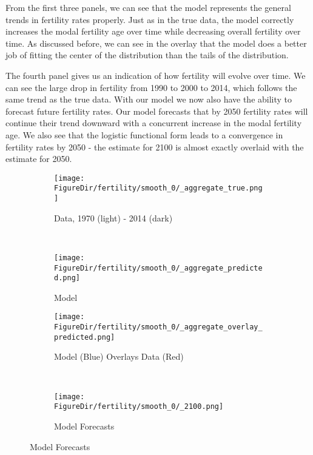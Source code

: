 \documentclass[10pt]{article}
\renewcommand{\thesection}{\arabic{section}}
\renewcommand{\thesubsection}{\thesection.\arabic{subsection}}
\renewcommand{\thesubsubsection}{\thesubsection.\arabic{subsubsection}}
\numberwithin{equation}{subsection}
\newcommand*{\FigureDir}{../../graphs}
\begin{document}
\par From the first three panels, we can see that the model represents the general trends in fertility rates properly. Just as in the true data, the model correctly increases the modal fertility age over time while decreasing overall fertility over time. As discussed before, we can see in the overlay that the model does a better job of fitting the center of the distribution than the tails of the distribution.

\par The fourth panel gives us an indication of how fertility will evolve over time. We can see the large drop in fertility from 1990 to 2000 to 2014, which follows the same trend as the true data. With our model we now also have the ability to forecast future fertility rates. Our model forecasts that by 2050 fertility rates will continue their trend downward with a concurrent increase in the modal fertility age. We also see that the logistic functional form leads to a convergence in fertility rates by 2050 - the estimate for 2100 is almost exactly overlaid with the estimate for 2050.

\begin{figure}[!ht]
	\centering
   \caption{\label{fig:\thesubsubsection.3}Fertility Generalized Beta 2 Model Fit}
		\begin{subfigure}{0.5\textwidth}
			\centering
			\texttt{[image: \\FigureDir/fertility/smooth\_0/\_aggregate\_true.png]}
			\caption{Data, 1970 (light) - 2014 (dark)}
		\end{subfigure}%
		~ %
		\begin{subfigure}{0.5\textwidth}
			\centering
			\texttt{[image: \\FigureDir/fertility/smooth\_0/\_aggregate\_predicted.png]}
			\caption{Model}
		\end{subfigure}%
		\newline
		\begin{subfigure}{0.5\textwidth}
			\centering
			\texttt{[image: \\FigureDir/fertility/smooth\_0/\_aggregate\_overlay\_predicted.png]}
			\caption{Model (Blue) Overlays Data (Red)}
		\end{subfigure}%
		~ %
		\begin{subfigure}{0.5\textwidth}
			\centering
			\texttt{[image: \\FigureDir/fertility/smooth\_0/\_2100.png]}
			\caption{Model Forecasts}
		\end{subfigure}%
\end{figure}
\end{document}
